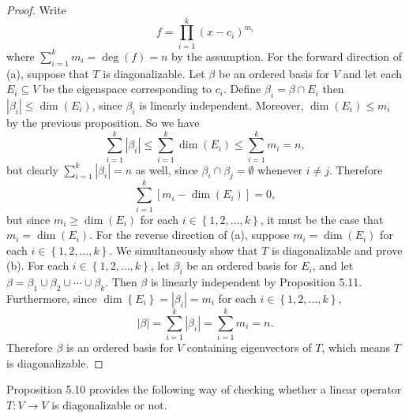 \documentclass[linearalgebraI]{subfiles}
\begin{document}
    \begin{proof}
        Write
        \begin{equation*}
            f = \prod^{k}_{i=1} \left( x-c_i \right) ^{m_i}
        \end{equation*}
        where $\sum^k_{i=1} m_i = \deg(f) = n$ by the assumption. For the forward direction of (a), suppose that $T$ is diagonalizable. Let $\beta$ be an ordered basis for $V$ and let each $E_i\subseteq V$ be the eigenspace corresponding to $c_i$. Define $\beta_i = \beta \cap E_i$ then $\left| \beta_i \right|\leq \dim \left( E_i \right)$, since $\beta_i$ is linearly independent. Moreover, $\dim \left( E_i \right)\leq m_i$ by the previous proposition. So we have
        \begin{equation*}
            \sum^k_{i=1} \left| \beta_i \right|\leq \sum^k_{i=1}\dim \left( E_i \right)\leq \sum^k_{i=1} m_i = n,
        \end{equation*}
        but clearly $\sum^k_{i=1} \left| \beta_i \right| = n$ as well, since $\beta_i\cap\beta_j = \emptyset$ whenever $i\neq j$. Therefore
        \begin{equation*}
            \sum^k_{i=1} \left[ m_i-\dim \left( E_i \right) \right] = 0,
        \end{equation*}
        but since $m_i\geq \dim \left( E_i \right)$ for each $i\in \left\lbrace 1, 2, \ldots, k \right\rbrace$, it must be the case that $m_i = \dim \left( E_i \right)$. For the reverse direction of (a), suppose $m_i = \dim \left( E_i \right)$ for each $i\in \left\lbrace 1, 2, \ldots, k \right\rbrace$. We simultaneously show that $T$ is diagonalizable and prove (b). For each $i\in \left\lbrace 1, 2, \ldots, k \right\rbrace$, let $\beta_i$ be an ordered basis for
        $E_i$, and let $\beta = \beta_1\cup\beta_2\cup\cdots\cup\beta_k$. Then $\beta$ is linearly independent by Proposition 5.11. Furthermore, since $\dim \left\lbrace E_i \right\rbrace = \left| \beta_i \right| = m_i$ for each $i\in \left\lbrace 1, 2, \ldots, k \right\rbrace$,
        \begin{equation*}
            \left| \beta \right| = \sum^k_{i=1} \left| \beta_i \right| = \sum^k_{i=1} m_i = n.
        \end{equation*}
        Therefore $\beta$ is an ordered basis for $V$ containing eigenvectors of $T$, which means $T$ is diagonalizable.
    \end{proof}

    \begin{remark}
        Proposition 5.10 provides the following way of checking whether a linear operator $T:V\to V$ is diagonalizable or not.
    \end{remark}
\end{document}
